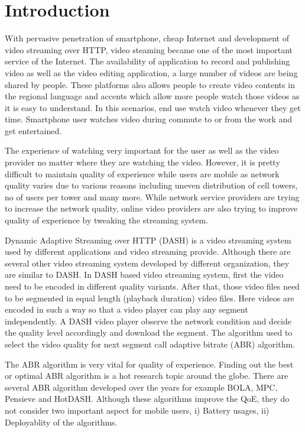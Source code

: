 \section{Introduction}
With pervasive penetration of smartphone, cheap Internet and development of video streaming over HTTP, video steaming became one of the most important service of the Internet. The availability of application to record and publishing video as well as the video editing application, a large number of videos are being shared by people. These platforms also allows people to create video contents in the regional language and accents which allow more people watch those videos as it is easy to understand. In this scenarios, end use watch video whenever they get time. Smartphone user watches video during commute to or from the work and get entertained.

The experience of watching very important for the user as well as the video provider no matter where they are watching the video. However, it is pretty difficult to maintain quality of experience while users are mobile as network quality varies due to various reasons including uneven distribution of cell towers, no of users per tower and many more. While network service providers are trying to increase the network quality, online video providers are also trying to improve quality of experience by tweaking the streaming system.

Dynamic Adaptive Streaming over HTTP (DASH) is a video streaming system used by different applications and video streaming provide. Although there are several other video streaming system developed by different organization, they are similar to DASH. In DASH based video streaming system, first the video need to be encoded in different quality variants. After that, those video files need to be segmented in equal length (playback duration) video files. Here videos are encoded in such a way so that a video player can play any segment independently. A DASH video player observe the network condition and decide the quality level accordingly and download the segment. The algorithm used to select the video quality for next segment call adaptive bitrate (ABR) algorithm.

The ABR algorithm is very vital for quality of experience. Finding out the best or optimal ABR algorithm is a hot research topic around the globe. There are several ABR algorithm developed over the years for example BOLA, MPC, Pensieve and HotDASH. Although these algorithms improve the QoE, they do not consider two important aspect for mobile users, i) Battery usages, ii) Deployablity of the algorithms.

